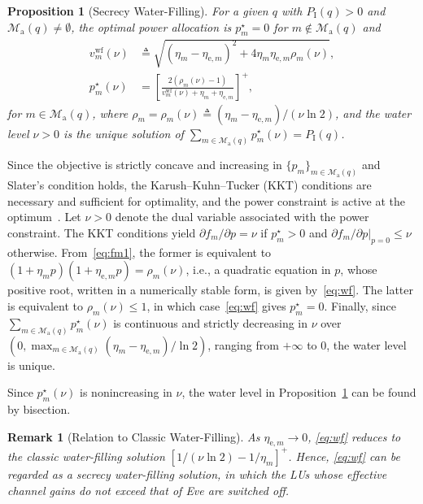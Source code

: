 \documentclass[journal]{IEEEtran}
\newtheorem{proposition}{Proposition}
\newtheorem{remark}{Remark}
\begin{document}
\begin{proposition}[Secrecy Water-Filling]\label{prop:wf}
For a given $q$ with $P_{\mathrm I}(q)>0$ and $\mathcal M_{\mathrm a}(q)\neq\emptyset$, the optimal power allocation is $p_m^\star=0$ for $m\notin\mathcal M_{\mathrm a}(q)$ and
\begin{equation}\label{eq:wf}
\begin{aligned}
v_m^{\mathrm{wf}}(\nu)
&\triangleq\sqrt{(\eta_m-\eta_{\mathrm{e},m})^2
 +4\eta_m\eta_{\mathrm{e},m}\rho_m(\nu)},\\
p_m^\star(\nu)
&=\left[\frac{2(\rho_m(\nu)-1)}
 {v_m^{\mathrm{wf}}(\nu)+\eta_m+\eta_{\mathrm{e},m}}\right]^+,
\end{aligned}
\end{equation}
for $m\in\mathcal M_{\mathrm a}(q)$, where $\rho_m=\rho_m(\nu)\triangleq(\eta_m-\eta_{\mathrm{e},m})/(\nu\ln2)$, and the water level $\nu>0$ is the unique solution of $\sum_{m\in\mathcal M_{\mathrm a}(q)}p_m^\star(\nu)=P_{\mathrm I}(q)$.
\end{proposition}
\begin{IEEEproof}
Since the objective is strictly concave and increasing in $\{p_m\}_{m\in\mathcal M_{\mathrm a}(q)}$ and Slater's condition holds, the Karush--Kuhn--Tucker (KKT) conditions are necessary and sufficient for optimality, and the power constraint is active at the optimum~\cite{Boyd2004}. Let $\nu>0$ denote the dual variable associated with the power constraint. The KKT conditions yield $\partial f_m/\partial p=\nu$ if $p_m^\star>0$ and $\partial f_m/\partial p|_{p=0}\le\nu$ otherwise. From~\eqref{eq:fm1}, the former is equivalent to $(1+\eta_mp)(1+\eta_{\mathrm{e},m}p)=\rho_m(\nu)$, i.e., a quadratic equation in $p$, whose positive root, written in a numerically stable form, is given by~\eqref{eq:wf}. The latter is equivalent to $\rho_m(\nu)\le1$, in which case~\eqref{eq:wf} gives $p_m^\star=0$. Finally, since $\sum_{m\in\mathcal M_{\mathrm a}(q)}p_m^\star(\nu)$ is continuous and strictly decreasing in $\nu$ over $(0,\max_{m\in\mathcal M_{\mathrm a}(q)}(\eta_m-\eta_{\mathrm{e},m})/\ln2)$, ranging from $+\infty$ to $0$, the water level is unique.
\end{IEEEproof}

Since $p_m^\star(\nu)$ is nonincreasing in $\nu$, the water level in Proposition~\ref{prop:wf} can be found by bisection.

\begin{remark}[Relation to Classic Water-Filling]\label{rem:wf}
As $\eta_{\mathrm{e},m}\to0$, \eqref{eq:wf} reduces to the classic water-filling solution $[1/(\nu\ln2)-1/\eta_m]^+$. Hence, \eqref{eq:wf} can be regarded as a secrecy water-filling solution, in which the LUs whose effective channel gains do not exceed that of Eve are switched off.
\end{remark}
\end{document}
